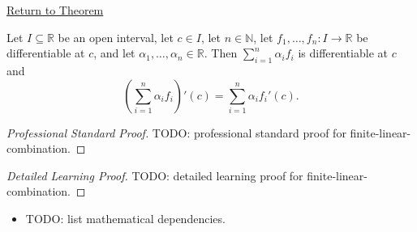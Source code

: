 \newpage
{}
\label{prf:finite-linear-combination}

\begin{remark*}[Return]
\hyperref[thm:finite-linear-combination-rule]{Return to Theorem}
\end{remark*}

\begin{theorem*}
Let $I \subseteq \mathbb{R}$ be an open interval, let $c \in I$, let $n \in \mathbb{N}$, let $f_1, \ldots, f_n : I \to \mathbb{R}$ be differentiable at $c$, and let $\alpha_1, \ldots, \alpha_n \in \mathbb{R}$. Then $\sum_{i=1}^{n} \alpha_i f_i$ is differentiable at $c$ and
\[
\left(\sum_{i=1}^{n} \alpha_i f_i\right)'(c) = \sum_{i=1}^{n} \alpha_i f_i'(c).
\]
\end{theorem*}

\begin{proof}[Professional Standard Proof]
\LRAProofBodyStart
TODO: professional standard proof for finite-linear-combination.
\end{proof}

\begin{proof}[Detailed Learning Proof]
\LRAProofBodyStart
TODO: detailed learning proof for finite-linear-combination.
\end{proof}

\begin{remark*}
\end{remark*}

\begin{dependencies}
\begin{itemize}
  \item TODO: list mathematical dependencies.
\end{itemize}
\end{dependencies}

\clearpage
